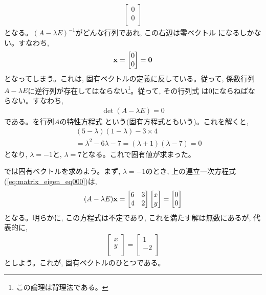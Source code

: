 \begin{exmpl}
\begin{eqnarray}
\begin{bmatrix}
0 \\
0 \\
\end{bmatrix}
\end{eqnarray}
となる。$(A-\lambda E)^{-1}$がどんな行列であれ, この右辺は零ベクトル
になるしかない。すなわち, 
\begin{eqnarray}
{\bf x}
=\begin{bmatrix}
0 \\
0 \\
\end{bmatrix}={\bf 0}
\end{eqnarray}
となってしまう。これは, 固有ベクトルの定義に反している。従って, 
係数行列$A-\lambda E$に逆行列が存在してはならない\footnote{この論理は背理法である。}。従って, その行列式
は0にならねばならない。すなわち, 
\begin{eqnarray}
\det(A-\lambda E)=0\label{eq:matrix_tokusei}
\end{eqnarray}
である。を行列$A$の\underline{特性方程式} 
という(固有方程式ともいう)。これを解くと, 
\begin{eqnarray*}
&&(5-\lambda)(1-\lambda)-3\times4\\
&&=\lambda^2-6\lambda-7=(\lambda+1)(\lambda-7)=0
\end{eqnarray*}
となり, $\lambda=-1$と, $\lambda=7$となる。これで固有値が求まった。

では固有ベクトルを求めよう。まず, $\lambda=-1$のとき, 上の連立一次方程式(\ref{eq:matrix_eigen_eq000})は, 
\begin{eqnarray}
(A-\lambda E){\bf x}=
\begin{bmatrix}
6          & 3 \\
4          & 2 \\
\end{bmatrix}
\begin{bmatrix}
x \\
y \\
\end{bmatrix}
=\begin{bmatrix}
0 \\
0 \\
\end{bmatrix}\end{eqnarray}
となる。明らかに, この方程式は不定であり, これを満たす解は無数にあるが, 代表的に, 
\begin{eqnarray}
\begin{bmatrix}
x \\
y \\
\end{bmatrix}
=\begin{bmatrix}
1 \\
-2 \\
\end{bmatrix}
\end{eqnarray}
としよう。これが, 固有ベクトルのひとつである。


\end{exmpl}
